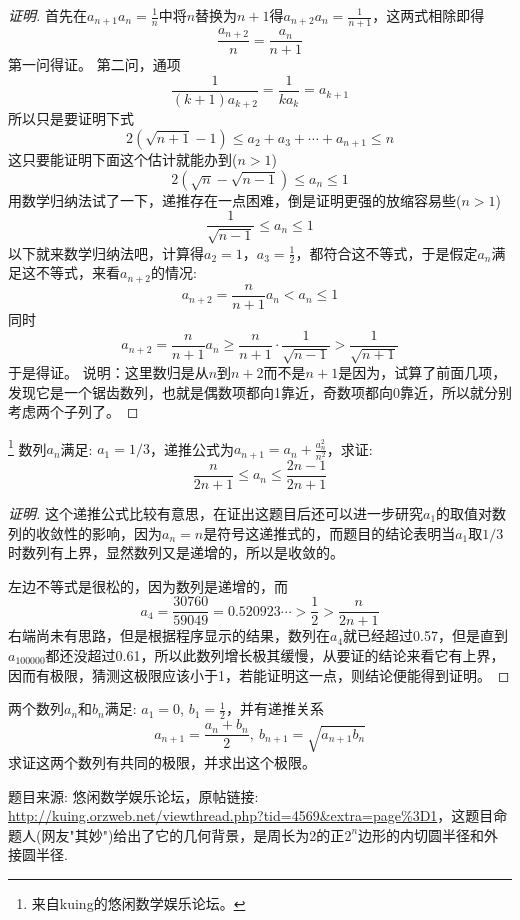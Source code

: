 \begin{proof}[证明]
  首先在$a_{n+1}a_n=\frac{1}{n}$中将$n$替换为$n+1$得$a_{n+2}a_{n}=\frac{1}{n+1}$，这两式相除即得
\[ \frac{a_{n+2}}{n} = \frac{a_n}{n+1} \]
第一问得证。
第二问，通项
\[ \frac{1}{(k+1)a_{k+2}} = \frac{1}{ka_k} = a_{k+1} \]
所以只是要证明下式
\[ 2(\sqrt{n+1}-1) \leqslant a_2+a_3+\cdots+a_{n+1} \leqslant n \]
这只要能证明下面这个估计就能办到($n>1$)
\[ 2(\sqrt{n}-\sqrt{n-1}) \leqslant a_n \leqslant 1 \]
用数学归纳法试了一下，递推存在一点困难，倒是证明更强的放缩容易些($n>1$)
\[ \frac{1}{\sqrt{n-1}} \leqslant a_n \leqslant 1 \]
以下就来数学归纳法吧，计算得$a_2=1$，$a_3=\frac{1}{2}$，都符合这不等式，于是假定$a_n$满足这不等式，来看$a_{n+2}$的情况:
\[ a_{n+2} = \frac{n}{n+1}a_n < a_n \leqslant 1 \]
同时
\[ a_{n+2} = \frac{n}{n+1}a_n \geqslant \frac{n}{n+1} \cdot \frac{1}{\sqrt{n-1}} > \frac{1}{\sqrt{n+1}} \]
于是得证。
说明：这里数归是从$n$到$n+2$而不是$n+1$是因为，试算了前面几项，发现它是一个锯齿数列，也就是偶数项都向1靠近，奇数项都向0靠近，所以就分别考虑两个子列了。
\end{proof}

\begin{exercise}\footnote{来自kuing的悠闲数学娱乐论坛。}
  数列$a_n$满足: $a_1=1/3$，递推公式为$a_{n+1}=a_n+\frac{a_n^2}{n^2}$，求证:
  \[ \frac{n}{2n+1} \leqslant a_n \leqslant \frac{2n-1}{2n+1} \]
\end{exercise}

\begin{proof}[证明]
  这个递推公式比较有意思，在证出这题目后还可以进一步研究$a_1$的取值对数列的收敛性的影响，因为$a_n=n$是符号这递推式的，而题目的结论表明当$a_1$取$1/3$时数列有上界，显然数列又是递增的，所以是收敛的。

  左边不等式是很松的，因为数列是递增的，而
  \[ a_4=\frac{30760}{59049}=0.520923\cdots>\frac{1}{2}>\frac{n}{2n+1} \]
  右端尚未有思路，但是根据程序显示的结果，数列在$a_4$就已经超过0.57，但是直到$a_{100000}$都还没超过0.61，所以此数列增长极其缓慢，从要证的结论来看它有上界，因而有极限，猜测这极限应该小于1，若能证明这一点，则结论便能得到证明。
\end{proof}

\begin{exercise} 
  两个数列$a_n$和$b_n$满足: $a_1=0$, $b_1=\frac{1}{2}$，并有递推关系
  \[ a_{n+1}=\frac{a_n+b_n}{2}, \  b_{n+1}=\sqrt{a_{n+1}b_n} \]
  求证这两个数列有共同的极限，并求出这个极限。
\end{exercise}

题目来源: 悠闲数学娱乐论坛，原帖链接: \url{http://kuing.orzweb.net/viewthread.php?tid=4569&extra=page%3D1}，这题目命题人(网友"其妙")给出了它的几何背景，是周长为2的正$2^n$边形的内切圆半径和外接圆半径.

